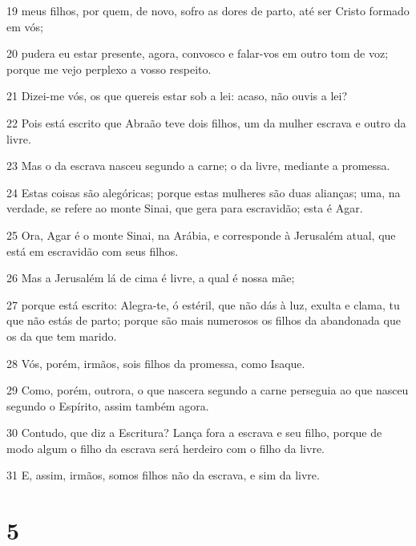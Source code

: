 \par 19 meus filhos, por quem, de novo, sofro as dores de parto, até ser Cristo formado em vós;
\par 20 pudera eu estar presente, agora, convosco e falar-vos em outro tom de voz; porque me vejo perplexo a vosso respeito.
\par 21 Dizei-me vós, os que quereis estar sob a lei: acaso, não ouvis a lei?
\par 22 Pois está escrito que Abraão teve dois filhos, um da mulher escrava e outro da livre.
\par 23 Mas o da escrava nasceu segundo a carne; o da livre, mediante a promessa.
\par 24 Estas coisas são alegóricas; porque estas mulheres são duas alianças; uma, na verdade, se refere ao monte Sinai, que gera para escravidão; esta é Agar.
\par 25 Ora, Agar é o monte Sinai, na Arábia, e corresponde à Jerusalém atual, que está em escravidão com seus filhos.
\par 26 Mas a Jerusalém lá de cima é livre, a qual é nossa mãe;
\par 27 porque está escrito: Alegra-te, ó estéril, que não dás à luz, exulta e clama, tu que não estás de parto; porque são mais numerosos os filhos da abandonada que os da que tem marido.
\par 28 Vós, porém, irmãos, sois filhos da promessa, como Isaque.
\par 29 Como, porém, outrora, o que nascera segundo a carne perseguia ao que nasceu segundo o Espírito, assim também agora.
\par 30 Contudo, que diz a Escritura? Lança fora a escrava e seu filho, porque de modo algum o filho da escrava será herdeiro com o filho da livre.
\par 31 E, assim, irmãos, somos filhos não da escrava, e sim da livre.

\chapter{5}

